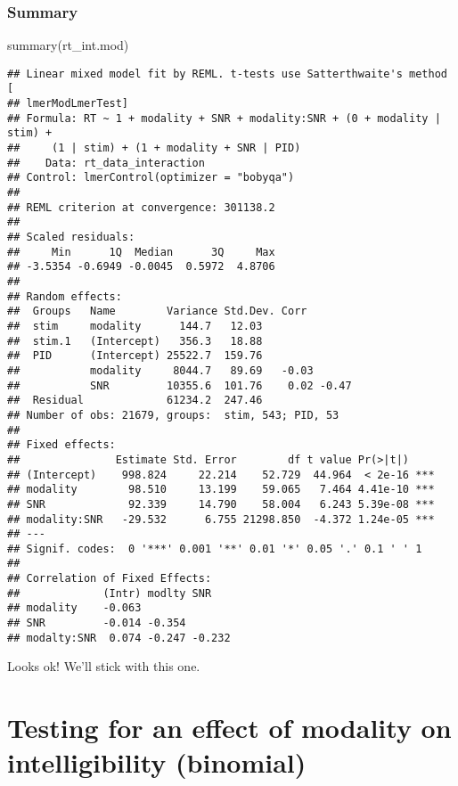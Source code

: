 \documentclass[
]{article}
\newenvironment{Shaded}{\begin{snugshade}}{\end{snugshade}}
\newcommand{\FunctionTok}[1]{\textcolor[rgb]{0.00,0.00,0.00}{#1}}
\newcommand{\NormalTok}[1]{#1}
\begin{document}
\hypertarget{summary-1}{%
\subsubsection{Summary}\label{summary-1}}

\begin{Shaded}
\begin{Highlighting}[]
\FunctionTok{summary}\NormalTok{(rt\_int.mod)}
\end{Highlighting}
\end{Shaded}

\begin{verbatim}
## Linear mixed model fit by REML. t-tests use Satterthwaite's method [
## lmerModLmerTest]
## Formula: RT ~ 1 + modality + SNR + modality:SNR + (0 + modality | stim) +  
##     (1 | stim) + (1 + modality + SNR | PID)
##    Data: rt_data_interaction
## Control: lmerControl(optimizer = "bobyqa")
## 
## REML criterion at convergence: 301138.2
## 
## Scaled residuals: 
##     Min      1Q  Median      3Q     Max 
## -3.5354 -0.6949 -0.0045  0.5972  4.8706 
## 
## Random effects:
##  Groups   Name        Variance Std.Dev. Corr       
##  stim     modality      144.7   12.03              
##  stim.1   (Intercept)   356.3   18.88              
##  PID      (Intercept) 25522.7  159.76              
##           modality     8044.7   89.69   -0.03      
##           SNR         10355.6  101.76    0.02 -0.47
##  Residual             61234.2  247.46              
## Number of obs: 21679, groups:  stim, 543; PID, 53
## 
## Fixed effects:
##               Estimate Std. Error        df t value Pr(>|t|)    
## (Intercept)    998.824     22.214    52.729  44.964  < 2e-16 ***
## modality        98.510     13.199    59.065   7.464 4.41e-10 ***
## SNR             92.339     14.790    58.004   6.243 5.39e-08 ***
## modality:SNR   -29.532      6.755 21298.850  -4.372 1.24e-05 ***
## ---
## Signif. codes:  0 '***' 0.001 '**' 0.01 '*' 0.05 '.' 0.1 ' ' 1
## 
## Correlation of Fixed Effects:
##             (Intr) modlty SNR   
## modality    -0.063              
## SNR         -0.014 -0.354       
## modalty:SNR  0.074 -0.247 -0.232
\end{verbatim}

Looks ok! We'll stick with this one.

\hypertarget{testing-for-an-effect-of-modality-on-intelligibility-binomial}{%
\section{Testing for an effect of modality on intelligibility
(binomial)}\label{testing-for-an-effect-of-modality-on-intelligibility-binomial}}
\end{document}
